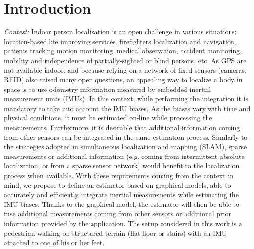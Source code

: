 
\section{Introduction}\label{sec:intro}

\textit{Context: }
Indoor person localization is an open challenge in various situations: location-based life improving services,
firefighters localization and navigation, patients tracking 
motion monitoring, medical observation, accident monitoring, mobility and independence of partially-sighted or blind persons, etc.
As GPS are not available indoor, and because relying on a network of fixed sensors (cameras, RFID) also raised many open questions, an appealing way to localize a body in space is to use odometry information measured by embedded inertial measurement units (IMUs).
In this context, while performing the integration it is mandatory to take into account the IMU biases.
As the biases vary with time and physical conditions, it must be estimated on-line while processing the measurements.
Furthermore, it is desirable that additional information coming from other sensors can be integrated in the same estimation process.
Similarly to the strategies adopted in simultaneous localization and mapping (SLAM), sparse measurements or additional information (e.g. coming from intermittent absolute localization, or from a sparse sensor network) would benefit to the localization process when available.
With these requirements coming from the context in mind, we propose to define an estimator based on graphical models, able to accurately and efficiently integrate inertial measurements while estimating the IMU biases. Thanks to the graphical model, the estimator will then be able to fuse additional measurements coming from other sensors or additional prior information provided by the application.
The setup considered in this work  is a pedestrian walking on structured terrain (flat floor or stairs) with an IMU attached to one of his or her feet.


